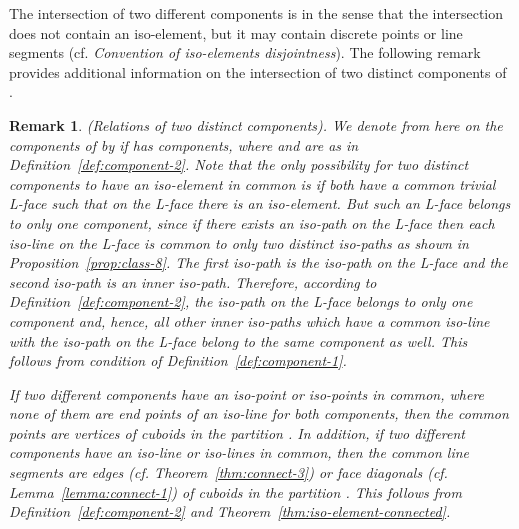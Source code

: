 \documentclass[a4paper,11pt]{article}
\newtheorem{remark}[theorem]{Remark}
\begin{document}
The intersection of two different components is  in the sense that the intersection does not
contain an iso-element, but it may contain discrete points or line segments (cf. {\it Convention of
iso-elements disjointness}). The following remark provides additional information on the intersection
of two distinct components of .

\begin{remark}(Relations of two distinct components).
We denote from here on the components of  by  if  has 
components, where  and  are as in Definition~\ref{def:component-2}. Note that the only
possibility for two distinct components to have an iso-element in common is if both have a common trivial L-face
such that on the L-face there is an iso-element. But such an L-face belongs to only one component, since if there
exists an iso-path on the L-face then each iso-line on the L-face is common to only two distinct iso-paths as
shown in Proposition~\ref{prop:class-8}. The first iso-path is the iso-path on the L-face and the second iso-path
is an inner iso-path. Therefore, according to Definition~\ref{def:component-2}, the iso-path on the L-face belongs
to only one component and, hence, all other inner iso-paths which have a common iso-line with the iso-path on the
L-face belong to the same component as well. This follows from condition  of Definition~\ref{def:component-1}.

If two different components have an iso-point or iso-points in common, where none of them are end points of
an iso-line for both components, then the common points are vertices of cuboids in the partition .
In addition, if two different components have an iso-line or iso-lines in common, then the common line segments
are edges (cf. Theorem~\ref{thm:connect-3}) or face diagonals (cf. Lemma~\ref{lemma:connect-1}) of cuboids in the
partition . This follows from Definition~\ref{def:component-2} and
Theorem~\ref{thm:iso-element-connected}.
\end{remark}
\end{document}

